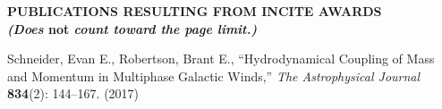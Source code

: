 \documentclass[11pt,letterpaper,english]{article}
\begin{document}
\setlength{\parindent}{0in} %


\pagestyle{fancy}   \renewcommand{%
\headrulewidth}{0.0pt}

\begin{center}
\bf {PUBLICATIONS RESULTING FROM INCITE AWARDS} \\
{\bf {\em (Does} not {\em count toward the page limit.)}}
\end{center}
\vspace{-.25in}



\leftskip 0.25in
\parindent -0.25in
{Schneider, Evan E., Robertson, Brant E., ``Hydrodynamical Coupling of Mass and Momentum in Multiphase Galactic Winds,'' {\em{The Astrophysical Journal}} {\bf{834}}(2): 144--167.} (2017)\\
\end{document}
